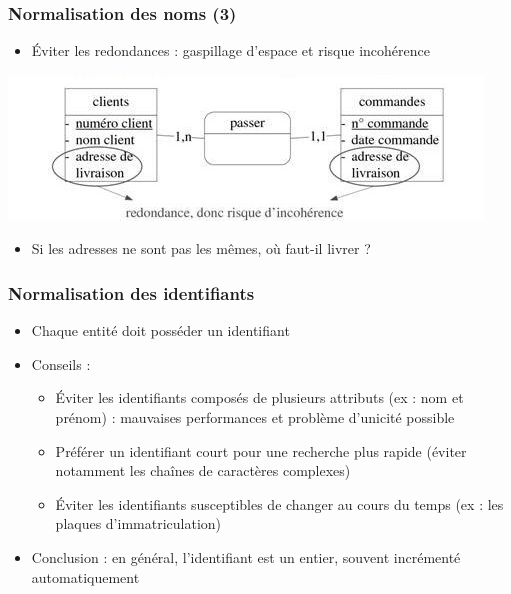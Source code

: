 \begin{frame}
  \frametitle{Normalisation des noms (3)}
  \begin{itemize}
    \item Éviter les redondances : gaspillage d'espace et risque incohérence
  \end{itemize}
  \begin{center}
    \includegraphics[width=0.8\linewidth]{redondance_attributs.jpg}
  \end{center}
  \begin{itemize}
    \item Si les adresses ne sont pas les mêmes, où faut-il livrer ?
  \end{itemize}
\end{frame}

\begin{frame}
  \frametitle{Normalisation des identifiants}
  \begin{itemize}
    \item Chaque entité doit posséder un identifiant
    \item Conseils :
      \begin{itemize}
        \item Éviter les identifiants composés de plusieurs attributs (ex : nom et prénom) : mauvaises
          performances et problème d'unicité possible
        \item Préférer un identifiant court pour une recherche plus rapide (éviter notamment les chaînes de
          caractères complexes)
        \item Éviter les identifiants susceptibles de changer au cours du temps (ex : les plaques d'immatriculation)
      \end{itemize}
    \item Conclusion : en général, l'identifiant est un entier, souvent incrémenté automatiquement
  \end{itemize}
\end{frame}

